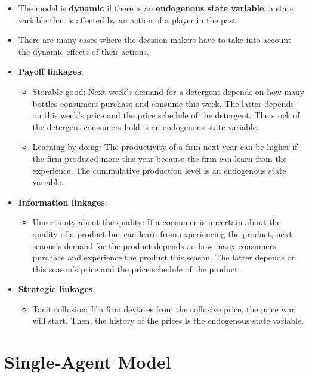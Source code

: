 \documentclass[]{book}
\providecommand{\tightlist}{%
  \setlength{\itemsep}{0pt}\setlength{\parskip}{0pt}}
\begin{document}
\begin{itemize}
\tightlist
\item
  The model is \textbf{dynamic} if there is an \textbf{endogenous state
  variable}, a state variable that is affected by an action of a player
  in the past.
\item
  There are many cases where the decision makers have to take into
  account the dynamic effects of their actions.
\item
  \textbf{Payoff linkages}:

  \begin{itemize}
  \tightlist
  \item
    Storable good: Next week's demand for a detergent depends on how
    many bottles consumers purchase and consume this week. The latter
    depends on this week's price and the price schedule of the
    detergent. The stock of the detergent consumers hold is an
    endogenous state variable.
  \item
    Learning by doing: The productivity of a firm next year can be
    higher if the firm produced more this year because the firm can
    learn from the experience. The cummulative production level is an
    endogenous state variable.
  \end{itemize}
\item
  \textbf{Information linkages}:

  \begin{itemize}
  \tightlist
  \item
    Uncertainty about the quality: If a consumer is uncertain about the
    quality of a product but can learn from experiencing the product,
    next seaons's demand for the product depends on how many consumers
    purchace and experience the product this season. The latter depends
    on this season's price and the price schedule of the product.
  \end{itemize}
\item
  \textbf{Strategic linkages}:

  \begin{itemize}
  \tightlist
  \item
    Tacit collusion: If a firm deviates from the collusive price, the
    price war will start. Then, the history of the prices is the
    endogenous state variable.
  \end{itemize}
\end{itemize}

\section{Single-Agent Model}\label{single-agent-model}
\end{document}
